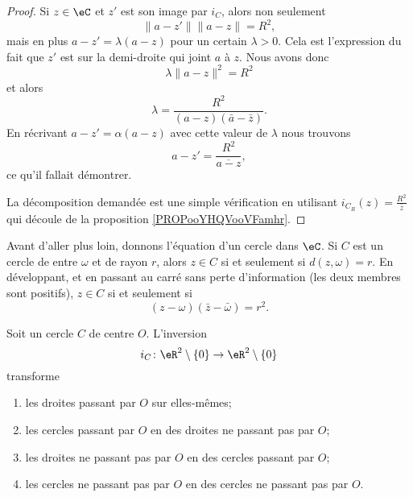 \begin{proof}
    Si \( z\in \eC\) et \( z'\) est son image par \( i_C\), alors non seulement
    \begin{equation}
        \| a-z' \|\| a-z \|=R^2,
    \end{equation}
    mais en plus \( a-z'=\lambda(a-z)\) pour un certain \( \lambda>0\). Cela est l'expression du fait que \( z'\) est sur la demi-droite qui joint \( a\) à \( z\). Nous avons donc
    \begin{equation}
        \lambda\| a-z \|^2=R^2
    \end{equation}
    et alors
    \begin{equation}
        \lambda=\frac{ R^2 }{ (a-z)(\bar a-\bar z) }.
    \end{equation}
    En récrivant \( a-z'=\alpha(a-z)\) avec cette valeur de \( \lambda\) nous trouvons
    \begin{equation}
        a-z'=\frac{ R^2 }{ \overline{ a-z } },
    \end{equation}
    ce qu'il fallait démontrer.

    La décomposition demandée est une simple vérification en utilisant \( i_{C_R}(z)=\frac{ R^2 }{ \bar z }\) qui découle de la proposition \ref{PROPooYHQVooVFamhr}.
\end{proof}

Avant d'aller plus loin, donnons l'équation d'un cercle dans \( \eC\). Si \( C\) est un cercle de entre \( \omega\) et de rayon \( r\), alors \( z\in C\) si et seulement si \( d(z,\omega)=r\). En développant, et en passant au carré sans perte d'information (les deux membres sont positifs), \( z\in C\) si et seulement si
\begin{equation}
    (z-\omega)(\bar z-\bar \omega)=r^2.
\end{equation}

\begin{proposition}     \label{PROPooMIMRooTbQRVI}
    Soit un cercle \( C\) de centre \( O\). L'inversion
    \begin{equation}
        i_C\colon \eR^2\setminus\{ 0 \}\to \eR^2\setminus\{ 0 \}
    \end{equation}
    transforme
    \begin{enumerate}
        \item       \label{ITEMooNOXMooQYNPnv}
            les droites passant par \( O\) sur elles-mêmes;
        \item
            les cercles passant par \( O\) en des droites ne passant pas par \( O\);
        \item       \label{ITEMooRFPSooGdJdHD}
            les droites ne passant pas par \( O\) en des cercles passant par \( O\);
        \item
            les cercles ne passant pas par \( O\) en des cercles ne passant pas par \( O\).
    \end{enumerate}
\end{proposition}

